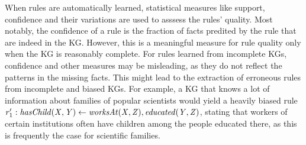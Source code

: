 When rules are automatically learned, statistical measures like support, confidence and their variations are used to asssess the rules' quality. Most notably, the confidence of a rule is the fraction of facts predited by the rule that are indeed in the KG. However, this is a meaningful measure for rule quality only when the KG is reasonably complete. For rules learned from incomplete KGs, confidence and other measures may be misleading, as they do not reflect the patterns in the missing facts. This might lead to the extraction of erroneous rules from incomplete and biased KGs. For example, a KG that knows a lot of information about families of popular scientists would yield a heavily biased rule $r_1':\mathit{hasChild(X,Y)\leftarrow worksAt(X,Z), educated(Y,Z)}$, stating that workers of certain institutions often have children among the people educated there, as this is frequently the case for scientific families.

